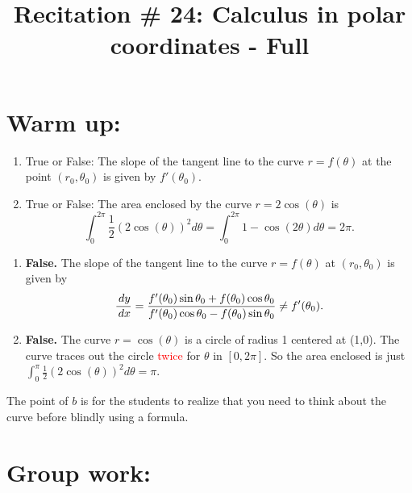 \documentclass[]{ximera}
\title{Recitation \# 24: Calculus in polar coordinates - Full}
\begin{document}
\begin{abstract}		\end{abstract}
\maketitle



\section{Warm up:}
\begin{enumerate}
\item True or False:  The slope of the tangent line to the curve $r = f(\theta)$ at the point $(r_0, \theta_0)$ is given by $f'(\theta_0)$.  

\item True or False: The area enclosed by the curve $r=2\cos(\theta)$ is 
$$\int_{0}^{2\pi} \frac{1}{2} (2 \cos (\theta))^2 d \theta = \int_0^{2\pi} 1-\cos(2\theta) d\theta = 2\pi.$$
\end{enumerate}

	\begin{freeResponse}
\begin{enumerate}
\item	{\bf False.}  The slope of the tangent line to the curve $r = f(\theta)$ at $(r_0, \theta_0)$ is given by
		\[
		\frac{\,d y}{\,d x} = \frac{f'(\theta_0) \sin \theta_0 + f(\theta_0) \cos \theta_0}{f'(\theta_0) \cos \theta_0 - f(\theta_0) \sin \theta_0 } \neq f'(\theta_0).
		\]

\item {\bf False.} The curve $r=\cos(\theta)$ is a circle of radius 1 centered at (1,0). The curve traces out the circle \textcolor{red}{twice} for $\theta$ in $[0, 2\pi]$. So the area enclosed is just $\int_0^{\pi} \frac{1}{2} (2 \cos(\theta))^2 d\theta = \pi$.
\end{enumerate}
	\end{freeResponse}
	
\begin{instructorNotes}
The point of $b$ is for the students to realize that you need to think about the curve before blindly using a formula.
\end{instructorNotes}







\section{Group work:}
\end{document}
